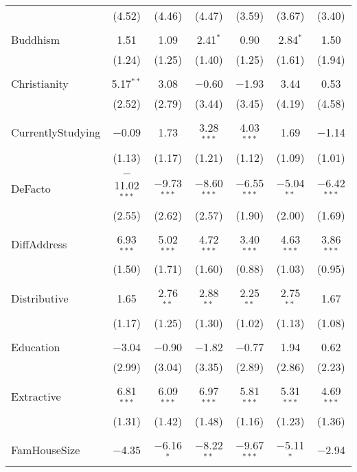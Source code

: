 \documentclass[openany]{book}
\begin{document}
\begin{table}[!htbp]
\begin{tabular}{@{\extracolsep{1pt}}lcccccc}
  & (4.52) & (4.46) & (4.47) & (3.59) & (3.67) & (3.40) \\ 
  & & & & & & \\ 
 Buddhism & 1.51 & 1.09 & 2.41$^{*}$ & 0.90 & 2.84$^{*}$ & 1.50 \\ 
  & (1.24) & (1.25) & (1.40) & (1.25) & (1.61) & (1.94) \\ 
  & & & & & & \\ 
 Christianity & 5.17$^{**}$ & 3.08 & $-$0.60 & $-$1.93 & 3.44 & 0.53 \\ 
  & (2.52) & (2.79) & (3.44) & (3.45) & (4.19) & (4.58) \\ 
  & & & & & & \\ 
 CurrentlyStudying & $-$0.09 & 1.73 & 3.28$^{***}$ & 4.03$^{***}$ & 1.69 & $-$1.14 \\ 
  & (1.13) & (1.17) & (1.21) & (1.12) & (1.09) & (1.01) \\ 
  & & & & & & \\ 
 DeFacto & $-$11.02$^{***}$ & $-$9.73$^{***}$ & $-$8.60$^{***}$ & $-$6.55$^{***}$ & $-$5.04$^{**}$ & $-$6.42$^{***}$ \\ 
  & (2.55) & (2.62) & (2.57) & (1.90) & (2.00) & (1.69) \\ 
  & & & & & & \\ 
 DiffAddress & 6.93$^{***}$ & 5.02$^{***}$ & 4.72$^{***}$ & 3.40$^{***}$ & 4.63$^{***}$ & 3.86$^{***}$ \\ 
  & (1.50) & (1.71) & (1.60) & (0.88) & (1.03) & (0.95) \\ 
  & & & & & & \\ 
 Distributive & 1.65 & 2.76$^{**}$ & 2.88$^{**}$ & 2.25$^{**}$ & 2.75$^{**}$ & 1.67 \\ 
  & (1.17) & (1.25) & (1.30) & (1.02) & (1.13) & (1.08) \\ 
  & & & & & & \\ 
 Education & $-$3.04 & $-$0.90 & $-$1.82 & $-$0.77 & 1.94 & 0.62 \\ 
  & (2.99) & (3.04) & (3.35) & (2.89) & (2.86) & (2.23) \\ 
  & & & & & & \\ 
 Extractive & 6.81$^{***}$ & 6.09$^{***}$ & 6.97$^{***}$ & 5.81$^{***}$ & 5.31$^{***}$ & 4.69$^{***}$ \\ 
  & (1.31) & (1.42) & (1.48) & (1.16) & (1.23) & (1.36) \\ 
  & & & & & & \\ 
 FamHouseSize & $-$4.35 & $-$6.16$^{*}$ & $-$8.22$^{**}$ & $-$9.67$^{***}$ & $-$5.11$^{*}$ & $-$2.94 \\ 

\end{tabular}
\end{table}
\end{document}
